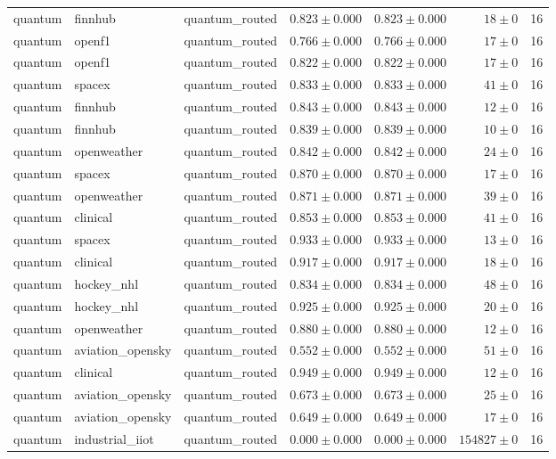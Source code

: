 \begin{table}[htbp]
\begin{tabular}{l l l r r r r}
quantum & finnhub & quantum\_routed & $0.823\pm0.000$ & $0.823\pm0.000$ & $18\pm0$ & 16 \\
quantum & openf1 & quantum\_routed & $0.766\pm0.000$ & $0.766\pm0.000$ & $17\pm0$ & 16 \\
quantum & openf1 & quantum\_routed & $0.822\pm0.000$ & $0.822\pm0.000$ & $17\pm0$ & 16 \\
quantum & spacex & quantum\_routed & $0.833\pm0.000$ & $0.833\pm0.000$ & $41\pm0$ & 16 \\
quantum & finnhub & quantum\_routed & $0.843\pm0.000$ & $0.843\pm0.000$ & $12\pm0$ & 16 \\
quantum & finnhub & quantum\_routed & $0.839\pm0.000$ & $0.839\pm0.000$ & $10\pm0$ & 16 \\
quantum & openweather & quantum\_routed & $0.842\pm0.000$ & $0.842\pm0.000$ & $24\pm0$ & 16 \\
quantum & spacex & quantum\_routed & $0.870\pm0.000$ & $0.870\pm0.000$ & $17\pm0$ & 16 \\
quantum & openweather & quantum\_routed & $0.871\pm0.000$ & $0.871\pm0.000$ & $39\pm0$ & 16 \\
quantum & clinical & quantum\_routed & $0.853\pm0.000$ & $0.853\pm0.000$ & $41\pm0$ & 16 \\
quantum & spacex & quantum\_routed & $0.933\pm0.000$ & $0.933\pm0.000$ & $13\pm0$ & 16 \\
quantum & clinical & quantum\_routed & $0.917\pm0.000$ & $0.917\pm0.000$ & $18\pm0$ & 16 \\
quantum & hockey\_nhl & quantum\_routed & $0.834\pm0.000$ & $0.834\pm0.000$ & $48\pm0$ & 16 \\
quantum & hockey\_nhl & quantum\_routed & $0.925\pm0.000$ & $0.925\pm0.000$ & $20\pm0$ & 16 \\
quantum & openweather & quantum\_routed & $0.880\pm0.000$ & $0.880\pm0.000$ & $12\pm0$ & 16 \\
quantum & aviation\_opensky & quantum\_routed & $0.552\pm0.000$ & $0.552\pm0.000$ & $51\pm0$ & 16 \\
quantum & clinical & quantum\_routed & $0.949\pm0.000$ & $0.949\pm0.000$ & $12\pm0$ & 16 \\
quantum & aviation\_opensky & quantum\_routed & $0.673\pm0.000$ & $0.673\pm0.000$ & $25\pm0$ & 16 \\
quantum & aviation\_opensky & quantum\_routed & $0.649\pm0.000$ & $0.649\pm0.000$ & $17\pm0$ & 16 \\
quantum & industrial\_iiot & quantum\_routed & $0.000\pm0.000$ & $0.000\pm0.000$ & $154827\pm0$ & 16 \\

\end{tabular}
\end{table}
